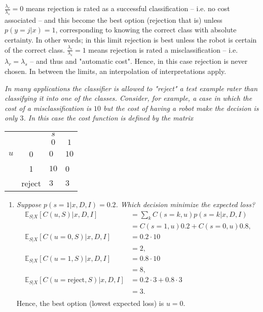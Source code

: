 \begin{example}
\begin{enumerate}
		$\frac{\lambda_r}{\lambda_s}=0$ means rejection is rated as a successful classification -- i.e. no cost associated -- and this become the best option (rejection that is) unless $p(y=j|x)=1$, corresponding to knowing the correct class with absolute certainty. In other words; in this limit rejection is best unless the robot is certain of the correct class. $\frac{\lambda_r}{\lambda_s}=1$ means rejection is rated a misclassification -- i.e. $\lambda_r=\lambda_s$ -- and thus and "automatic cost". Hence, in this case rejection is never chosen. In between the limits, an interpolation of interpretations apply.
	\end{enumerate}
\end{example}

\begin{example}
	\emph{In many applications the classifier is allowed to "reject" a test example rater than classifying it into one of the classes. Consider, for example, a case in which the cost of a misclassification is $10$ but the cost of having a robot make the decision is only $3$. In this case the cost function is defined by the matrix}
	
	\begin{center}
		\begin{tabular}{ c  c  c  c }
			&& $s$& \\
			&& $0$ & $1$  \\
			\cline{3-4}
			$u$ & 0& \multicolumn{1}{|l}{$0$} &\multicolumn{1}{l|}{$10$}  \\
			& 1& \multicolumn{1}{|l}{$10$} & \multicolumn{1}{l|}{0} \\
			& reject& \multicolumn{1}{|l}{$3$} & \multicolumn{1}{l|}{$3$} \\
			\cline{3-4}
		\end{tabular}
	\end{center}
	
	\begin{enumerate}
		\item \emph{Suppose $p(s=1|x,D,I)=0.2$. Which decision minimize the expected loss?}
		\begin{equation}
			\begin{split}
				\mathbb{E}_{S|X}[C(u, S)|x,D,I]&=\sum_kC(s=k,u)p(s=k|x,D,I)\\
				&=C(s=1,u)0.2+C(s=0,u)0.8,\\
				\mathbb{E}_{S|X}[C(u=0, S)|x,D,I] &= 0.2\cdot 10 \\
				&= 2,\\
				\mathbb{E}_{S|X}[C(u=1, S)|x,D,I] &= 0.8\cdot 10 \\
				&= 8,\\
				\mathbb{E}_{S|X}[C(u= \text{reject}, S)|x,D,I] &= 0.2\cdot 3+0.8\cdot3 \\
				&= 3.\\
			\end{split}
		\end{equation}
		Hence, the best option (lowest expected loss) is $u=0$.
		

\end{enumerate}
\end{example}
